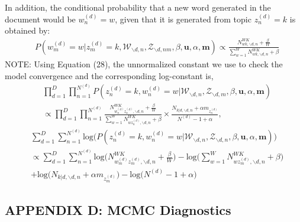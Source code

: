 \documentclass[a4paper]{article}
\begin{document}
  In addition, the conditional probability that a new word generated in the document would be $w_n^{(d)}=w$, given that it is generated from topic $z_n^{(d)}=k$ is obtained by:
  \begin{equation}
  \begin{aligned}
  & P(w^{(d)}_m=w|z^{(d)}_m=k, \mathcal{W}_{\backslash d, n}, \mathcal{Z}_{\backslash d, nm}, \beta, \boldsymbol{u}, \alpha, \boldsymbol{m}) \propto 
  \frac{N_{wk, \backslash d, n}^{WK}+\frac{\beta}{W}}{\sum_{w=1}^WN_{wk, \backslash d, n}^{WK}+\beta}
  \end{aligned} 
  \end{equation}
  NOTE: Using Equation (28), the unnormalized constant we use to check the model convergence and the corresponding log-constant is,
  \begin{equation}
  \begin{aligned}
  & \prod_{d=1}^{D}\prod_{n=1}^{N^{(d)}}  P(z^{(d)}_n=k, w^{(d)}_n=w|\mathcal{W}_{\backslash d, n}, \mathcal{Z}_{\backslash d,m}, \beta, \boldsymbol{u}, \alpha, \boldsymbol{m}) \\ & \propto \prod_{d=1}^{D}\prod_{n=1}^{N^{(d)}} 
  \frac{N_{w^{(d)}_nz^{(d)}_n, \backslash d, n}^{WK}+\frac{\beta}{W}}{\sum_{w=1}^WN_{wz^{(d)}_n,  \backslash d, n}^{WK}+\beta}\times\frac{N_{k|d, \backslash d, n}+\alpha m_{z^{(d)}_n}}{N^{(d)}-1+\alpha},
  \end{aligned}
  \end{equation}
  \begin{equation}
  \begin{aligned}
  & \sum_{d=1}^{D}\sum_{n=1}^{N^{(d)}} \mbox{log}\Big( P(z^{(d)}_n=k, w^{(d)}_n=w|\mathcal{W}_{\backslash d, n}, \mathcal{Z}_{\backslash d, n}, \beta, \boldsymbol{u}, \alpha, \boldsymbol{m})\Big) \\ & \propto \sum_{d=1}^{D}\sum_{n=1}^{N^{(d)}} 
  \mbox{log}\Big(N_{w^{(d)}_mz^{(d)}_m, \backslash d, n}^{WK}+\frac{\beta}{W}\Big)-\mbox{log}\Big(\sum_{w=1}^WN_{wz^{(d)}_m,  \backslash d, n}^{WK}+\beta\Big)\\&+\mbox{log}\Big(N_{k|d, \backslash d, n}+\alpha m_{z^{(d)}_m}\Big)-\mbox{log}\Big(N^{(d)}-1+\alpha\Big)
  \end{aligned}
  \end{equation}
  \subsection*{APPENDIX D: MCMC Diagnostics}
  
  	\clearpage


\end{document}
